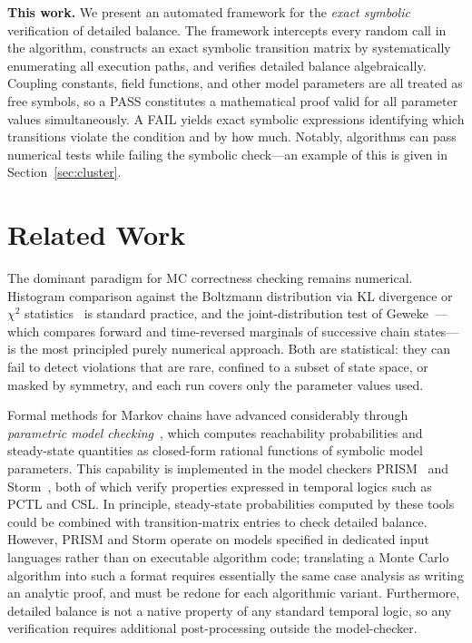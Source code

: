 \documentclass[twocolumn,10pt]{article}
\begin{document}
\medskip\noindent\textbf{This work.}
We present an automated framework for the \emph{exact symbolic} verification of
detailed balance.  The framework intercepts every random call in the algorithm,
constructs an exact symbolic transition matrix by systematically enumerating all
execution paths, and verifies detailed balance algebraically.  Coupling constants,
field functions, and other model parameters are all treated as free symbols, so a
PASS constitutes a mathematical proof valid for all parameter values
simultaneously.  A FAIL yields exact symbolic expressions identifying which
transitions violate the condition and by how much.  Notably, algorithms can pass
numerical tests while failing the symbolic check---an example of this is given in
Section~\ref{sec:cluster}.

\section{Related Work}
\label{sec:related}

The dominant paradigm for MC correctness checking remains numerical.
Histogram comparison against the Boltzmann distribution via KL divergence
or $\chi^2$ statistics~\cite{Newman1999} is standard practice, and the
joint-distribution test of Geweke~\cite{Geweke2004}---which compares forward
and time-reversed marginals of successive chain states---is the most
principled purely numerical approach.  Both are statistical: they can fail
to detect violations that are rare, confined to a subset of state space, or
masked by symmetry, and each run covers only the parameter values used.

Formal methods for Markov chains have advanced considerably through
\emph{parametric model checking}~\cite{Daws2004}, which computes
reachability probabilities and steady-state quantities as closed-form
rational functions of symbolic model parameters.  This capability is
implemented in the model checkers PRISM~\cite{Kwiatkowska2011} and
Storm~\cite{Dehnert2017}, both of which verify properties expressed in
temporal logics such as PCTL and CSL.  In principle, steady-state
probabilities computed by these tools could be combined with
transition-matrix entries to check detailed balance.  However, PRISM and
Storm operate on models specified in dedicated input languages rather than
on executable algorithm code; translating a Monte Carlo algorithm into such
a format requires essentially the same case analysis as writing an analytic
proof, and must be redone for each algorithmic variant.  Furthermore,
detailed balance is not a native property of any standard temporal logic,
so any verification requires additional post-processing outside the
model-checker.
\end{document}

